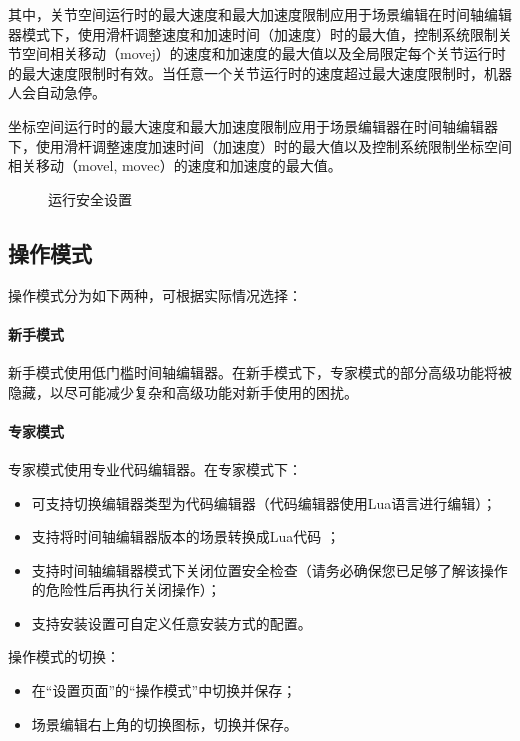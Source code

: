 其中，关节空间运行时的最大速度和最大加速度限制应用于场景编辑在时间轴编辑器模式下，使用滑杆调整速度和加速时间（加速度）时的最大值，控制系统限制关节空间相关移动（movej）的速度和加速度的最大值以及全局限定每个关节运行时的最大速度限制时有效。当任意一个关节运行时的速度超过最大速度限制时，机器人会自动急停。

坐标空间运行时的最大速度和最大加速度限制应用于场景编辑器在时间轴编辑器下，使用滑杆调整速度加速时间（加速度）时的最大值以及控制系统限制坐标空间相关移动（movel, movec）的速度和加速度的最大值。

\begin{figure}[ht]
	\centering
	\color{red}{缺图}
	\caption{运行安全设置}
	\label{fig:运行安全设置}
\end{figure}


\subsection{操作模式}
操作模式分为如下两种，可根据实际情况选择：
\paragraph{新手模式}
新手模式使用低门槛时间轴编辑器。在新手模式下，专家模式的部分高级功能将被隐藏，以尽可能减少复杂和高级功能对新手使用的困扰。
\paragraph{专家模式}
专家模式使用专业代码编辑器。在专家模式下：
\begin{itemize}
\item 可支持切换编辑器类型为代码编辑器（代码编辑器使用Lua语言进行编辑）；
\item 支持将时间轴编辑器版本的场景转换成Lua代码 ；
\item 支持时间轴编辑器模式下关闭位置安全检查（请务必确保您已足够了解该操作的危险性后再执行关闭操作）；
\item 支持安装设置可自定义任意安装方式的配置。
\end{itemize}

操作模式的切换：
\begin{itemize}
	\item 在“设置页面”的“操作模式”中切换并保存；
	\item 场景编辑右上角的切换图标，切换并保存。
\end{itemize}

